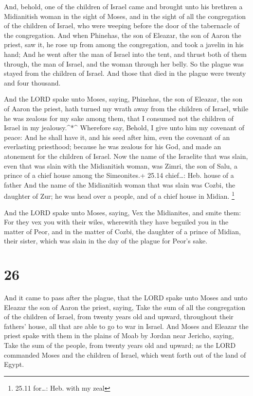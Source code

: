  And, behold, one of the children of Israel came and brought
unto his brethren a Midianitish woman in the sight of Moses, and in the
sight of all the congregation of the children of Israel, who were
weeping before the door of the tabernacle of the congregation.
 And when Phinehas, the son of Eleazar, the son of Aaron the
priest, saw it, he rose up from among the congregation, and took a
javelin in his hand;  And he went after the man of Israel
into the tent, and thrust both of them through, the man of Israel, and
the woman through her belly. So the plague was stayed from the children
of Israel.  And those that died in the plague were twenty
and four thousand.

 And the LORD spake unto Moses, saying, 
Phinehas, the son of Eleazar, the son of Aaron the priest, hath turned
my wrath away from the children of Israel, while he was zealous for my
sake among them, that I consumed not the children of Israel in my
jealousy.\^{}*\^{}  Wherefore say, Behold, I give unto him
my covenant of peace:  And he shall have it, and his seed
after him, even the covenant of an everlasting priesthood; because he
was zealous for his God, and made an atonement for the children of
Israel.  Now the name of the Israelite that was slain, even
that was slain with the Midianitish woman, was Zimri, the son of Salu, a
prince of a chief house among the Simeonites.+ 25.14 chief\ldots: Heb.
house of a father  And the name of the Midianitish woman
that was slain was Cozbi, the daughter of Zur; he was head over a
people, and of a chief house in Midian. \footnote{25.11 for\ldots: Heb.
  with my zeal}

 And the LORD spake unto Moses, saying,  Vex
the Midianites, and smite them:  For they vex you with
their wiles, wherewith they have beguiled you in the matter of Peor, and
in the matter of Cozbi, the daughter of a prince of Midian, their
sister, which was slain in the day of the plague for Peor's sake.

\hypertarget{section-25}{%
\section{26}\label{section-25}}

 And it came to pass after the plague, that the LORD spake
unto Moses and unto Eleazar the son of Aaron the priest, saying,
 Take the sum of all the congregation of the children of
Israel, from twenty years old and upward, throughout their fathers'
house, all that are able to go to war in Israel.  And Moses
and Eleazar the priest spake with them in the plains of Moab by Jordan
near Jericho, saying,  Take the sum of the people, from
twenty years old and upward; as the LORD commanded Moses and the
children of Israel, which went forth out of the land of Egypt.

